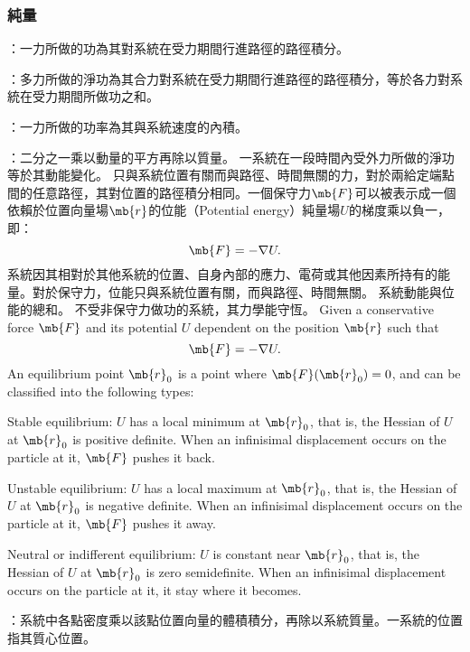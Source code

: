 \documentclass[a4paper,12pt]{article}
\begin{document}
\subsubsection{純量}
\bit
\item{}：一力所做的功為其對系統在受力期間行進路徑的路徑積分。
\item{}：多力所做的淨功為其合力對系統在受力期間行進路徑的路徑積分，等於各力對系統在受力期間所做功之和。
\item{}：一力所做的功率為其與系統速度的內積。
\item{}：二分之一乘以動量的平方再除以質量。
\ei
{}
一系統在一段時間內受外力所做的淨功等於其動能變化。
只與系統位置有關而與路徑、時間無關的力，對於兩給定端點間的任意路徑，其對位置的路徑積分相同。一個保守力$\mb{F}$可以被表示成一個依賴於位置向量場$\mb{r}$的位能（Potential energy）純量場$U$的梯度乘以負一，即：
\[\mb{F}=-\nabla U.\]
系統因其相對於其他系統的位置、自身內部的應力、電荷或其他因素所持有的能量。對於保守力，位能只與系統位置有關，而與路徑、時間無關。
系統動能與位能的總和。
不受非保守力做功的系統，其力學能守恆。
Given a conservative force $\mb{F}$ and its potential $U$ dependent on the position $\mb{r}$ such that
\[\mb{F}=-\nabla U.\]
An equilibrium point $\mb{r}_0$ is a point where $\mb{F}(\mb{r}_0)=0$, and can be classified into the following types:
\bit
\item Stable equilibrium: $U$ has a local minimum at $\mb{r}_0$, that is, the Hessian of $U$ at $\mb{r}_0$ is positive definite. When an infinisimal displacement occurs on the particle at it, $\mb{F}$ pushes it back.
\item Unstable equilibrium: $U$ has a local maximum at $\mb{r}_0$, that is, the Hessian of $U$ at $\mb{r}_0$ is negative definite. When an infinisimal displacement occurs on the particle at it, $\mb{F}$ pushes it away.
\item Neutral or indifferent equilibrium: $U$ is constant near $\mb{r}_0$, that is, the Hessian of $U$ at $\mb{r}_0$ is zero semidefinite. When an infinisimal displacement occurs on the particle at it, it stay where it becomes.
\eit
{}
\bit
\item{}：系統中各點密度乘以該點位置向量的體積積分，再除以系統質量。一系統的位置指其質心位置。
\end{document}
